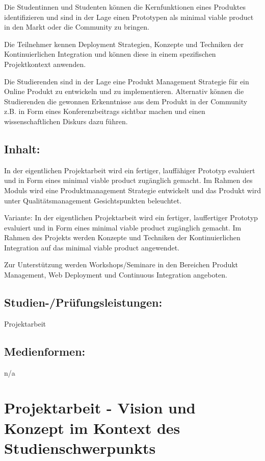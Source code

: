 Die Studentinnen und Studenten können die Kernfunktionen eines Produktes
identifizieren und sind in der Lage einen Prototypen als minimal viable
product in den Markt oder die Community zu bringen.

Die Teilnehmer kennen Deployment Strategien, Konzepte und Techniken der
Kontinuierlichen Integration und können diese in einem spezifischen
Projektkontext anwenden.

Die Studierenden sind in der Lage eine Produkt Management Strategie für
ein Online Produkt zu entwickeln und zu implementieren. Alternativ
können die Studierenden die gewonnen Erkenntnisse aus dem Produkt in der
Community z.B. in Form eines Konferenzbeitrags sichtbar machen und einen
wissenschaftlichen Diskurs dazu führen.

\section*{Inhalt:}\label{inhalt-15}

In der eigentlichen Projektarbeit wird ein fertiger, lauffähiger
Prototyp evaluiert und in Form eines minimal viable product zugänglich
gemacht. Im Rahmen des Moduls wird eine Produktmanagement Strategie
entwickelt und das Produkt wird unter Qualitätsmanagement
Gesichtspunkten beleuchtet.

Variante: In der eigentlichen Projektarbeit wird ein fertiger,
lauffertiger Prototyp evaluiert und in Form eines minimal viable product
zugänglich gemacht. Im Rahmen des Projekts werden Konzepte und Techniken
der Kontinuierlichen Integration auf das minimal viable product
angewendet.

Zur Unterstützung werden Workshops/Seminare in den Bereichen Produkt
Management, Web Deployment und Continuous Integration angeboten.

\section*{Studien-/Prüfungsleistungen:}\label{studien-pruxfcfungsleistungen-15}

Projektarbeit

\section*{Medienformen:}\label{medienformen-15}

n/a

\chapter{Projektarbeit - Vision und Konzept im Kontext des
Studienschwerpunkts}\label{projektarbeit---vision-und-konzept-im-kontext-des-studienschwerpunkts}

